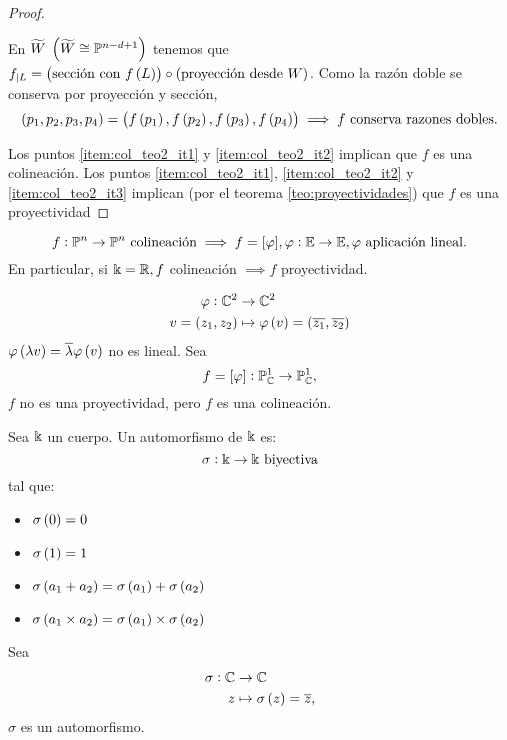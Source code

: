 \begin{proof}
\begin{enumerate}[(1)]
        En $\widetilde{W} \; \left( \widetilde{W}\cong\mathbb{P}^{n-d+1} \right)$ tenemos que $f_{|L} = \left( \text{sección con }f \left( L \right) \right) \circ \left( \text{proyección desde } W \right)$. Como la razón doble se conserva por proyección y sección,
        \[ \left( p_1, p_2, p_3, p_4 \right) = \left( f \left( p_1 \right), f \left( p_2 \right), f \left( p_3 \right), f \left( p_4 \right) \right) \implies f \text{ conserva razones dobles.}
        \]
    \end{enumerate}
    \noindent Los puntos \eqref{item:col_teo2_it1} y \eqref{item:col_teo2_it2} implican que $f$ es una colineación. Los puntos \eqref{item:col_teo2_it1}, \eqref{item:col_teo2_it2} y \eqref{item:col_teo2_it3} implican (por el teorema \ref{teo:proyectividades}) que $f$ es una proyectividad
\end{proof}
\begin{teo}
    \[ f : \mathbb{P}^n \to \mathbb{P}^n \text{ colineación} \implies f = [\varphi], \varphi : \mathbb{E} \to \mathbb{E}, \varphi \text{ aplicación lineal}. \]
    En particular, si $\Bbbk = \mathbb{R}, f$ colineación $\implies f$ proyectividad.
\end{teo}
\begin{example}
    \begin{align*}
        \varphi : \mathbb{C}^2 &\to \mathbb{C}^2 \\
        v = \left( z_1, z_2 \right) &\mapsto \varphi \left( v \right) = \left( \overline{z_1}, \overline{z_2} \right)
    \end{align*}
    $\varphi \left( \lambda v \right) = \overline{\lambda} \varphi \left( v \right)$ no es lineal. Sea 
    \[ f = [\varphi] : \mathbb{P}^1_{\mathbb{C}} \to \mathbb{P}^1_{\mathbb{C}}, \]
    $f$ no es una proyectividad, pero $f$ es una colineación.
\end{example}
\begin{defi}
    Sea $\Bbbk$ un cuerpo. Un automorfismo de $\Bbbk$ es:
    \[ \sigma : \Bbbk \to \Bbbk \text{ biyectiva} \]
    tal que:
    \begin{itemize}
        \item $\sigma \left( 0 \right) = 0$
        \item $\sigma \left( 1 \right) = 1$
        \item $\sigma \left( a_1 + a_2 \right) = \sigma \left( a_1 \right) + \sigma \left( a_2 \right)$
        \item $\sigma \left( a_1 \times a_2 \right) = \sigma \left( a_1 \right) \times \sigma \left( a_2 \right)$
    \end{itemize}
\end{defi}
\begin{example}
    Sea
    \begin{align*}
        \sigma : \mathbb{C} &\to \mathbb{C} \\
        z &\mapsto \sigma \left( z \right) = \overline{z},
    \end{align*}
    $\sigma$ es un automorfismo.
\end{example}
